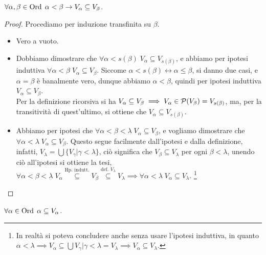 \begin{lemma}[``Ordinamento'' di $V_*$]
	$\forall \alpha, \beta \in \operatorname{Ord} \; \alpha < \beta \rightarrow V_\alpha \subseteq V_\beta$.
\end{lemma}

\begin{proof}
	Procediamo per induzione transfinita su $\beta$.
	\begin{itemize}
		\item[$\boxed{\text{caso $\beta = 0$}}$] Vero a vuoto.
		\item[$\boxed{\text{caso successore}}$] Dobbiamo dimostrare che $\forall \alpha < s(\beta) \; V_\alpha \subseteq V_{s(\beta)}$, e abbiamo per ipotesi induttiva $\forall \alpha < \beta \; V_\alpha \subseteq V_\beta$.
		Siccome $\alpha < s(\beta) \leftrightarrow \alpha \leq \beta$, si danno due casi, e $\alpha = \beta$ \`e banalmente vero, dunque abbiamo $\alpha < \beta$, quindi per ipotesi induttiva $V_\alpha \subseteq V_\beta$.\\
		Per la definizione ricorsiva si ha $V_\alpha \subseteq V_\beta \implies V_\alpha \in \mathcal{P}(V_\beta) = V_{s(\beta)}$, ma, per la transitivit\`a di quest'ultimo, si ottiene che $V_\alpha \subseteq V_{s(\beta)}$.
		\item[$\boxed{\text{caso limite}}$] Abbiamo per ipotesi che $\forall \alpha < \beta < \lambda \; V_\alpha \subseteq V_\beta$, e vogliamo dimostrare che $\forall \alpha < \lambda \; V_\alpha \subseteq V_\beta$. Questo segue facilmente dall'ipotesi e dalla definizione,
		infatti, $V_\lambda = \bigcup\{V_\gamma | \gamma < \lambda\}$, ci\`o significa che $V_\beta \subseteq V_\lambda$ per ogni $\beta < \lambda$, unendo ci\`o all'ipotesi si ottiene la tesi, $\forall \alpha < \beta < \lambda \; V_\alpha \overset{\text{Hp. indutt.}}{\subseteq} V_\beta \overset{\text{def. $V_\lambda$}}{\subseteq} V_\lambda \implies \forall \alpha < \lambda\; V_\alpha \subseteq V_\lambda$.
		\footnote{In realt\`a si poteva concludere anche senza usare l'ipotesi induttiva, in quanto $\alpha < \lambda \implies V_\alpha \subseteq \bigcup{V_\gamma | \gamma < \lambda} = V_\lambda \implies V_\alpha \subseteq V_\lambda$.}
	\end{itemize}
\end{proof}

\begin{lemma}
	$\forall \alpha \in \operatorname{Ord} \; \alpha \subseteq V_\alpha$.
\end{lemma}

